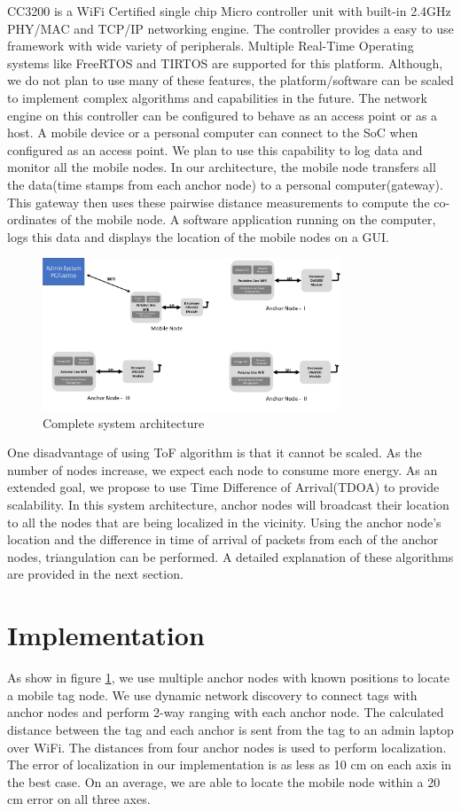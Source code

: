 \documentclass[journal,transmag]{IEEEtran}
\begin{document}
CC3200 is a WiFi Certified single chip Micro controller unit with built-in 2.4GHz PHY/MAC and TCP/IP networking engine. The controller provides a easy to use framework with wide variety of peripherals. Multiple Real-Time Operating systems like FreeRTOS and TIRTOS are supported for this platform. Although, we do not plan to use many of these features, the platform/software can be scaled to implement complex algorithms and capabilities in the future. The network engine on this controller can be configured to behave as an access point or as a host. A mobile device or a personal computer can connect to the SoC when configured as an access point. We plan to use this capability to log data and monitor all the mobile nodes. In our architecture, the mobile node transfers all the data(time stamps from each anchor node) to a personal computer(gateway). This gateway then uses these pairwise distance measurements to compute the co-ordinates of the mobile node. A software application running on the computer, logs this data and displays the location of the mobile nodes on a GUI. 

\begin{figure}[!h]
\centering
\includegraphics[width=3.5in]{sysbd.png}
\caption{{Complete system architecture}}
\label{SYSTEMBD}
\end{figure}

One disadvantage of using ToF algorithm is that it cannot be scaled. As the number of nodes increase, we expect each node to consume more energy. As an extended goal, we propose to use Time Difference of Arrival(TDOA)\cite{anthonyrowe's paper} to provide scalability. In this system architecture, anchor nodes will broadcast their location to all the nodes that are being localized in the vicinity. Using the anchor node's location and the difference in time of arrival of packets from each of the anchor nodes, triangulation can be performed. A detailed explanation of these algorithms are provided in the next section.

\section{Implementation}
As show in figure \ref{SYSTEMBD}, we use multiple anchor nodes with known positions to locate a mobile tag node. We use dynamic network discovery to connect tags with anchor nodes and perform 2-way ranging with each anchor node. The calculated distance between the tag and each anchor is sent from the tag to an admin laptop over WiFi. The distances from four anchor nodes is used to perform localization. The error of localization in our implementation is as less as 10 cm on each axis in the best case. On an average, we are able to locate the mobile node within a 20 cm error on all three axes. 
\end{document}
